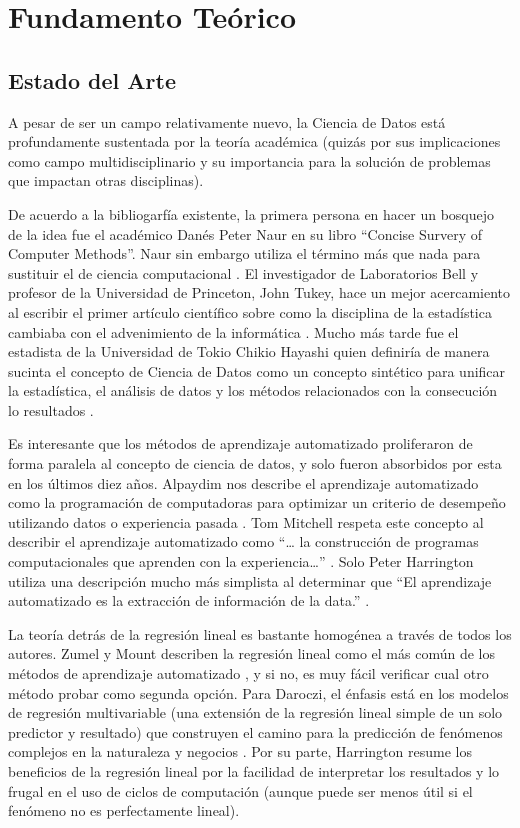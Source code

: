 \chapter{Fundamento Teórico}

\section{Estado del Arte}
A pesar de ser un campo relativamente nuevo, la Ciencia de Datos está profundamente sustentada por la teoría académica (quizás por sus implicaciones como campo multidisciplinario y su importancia para la solución de problemas que impactan otras disciplinas).

De acuerdo a la bibliogarfía existente, la primera persona en hacer un bosquejo de la idea fue el académico Danés Peter Naur en su libro “Concise Survery of Computer Methods”. Naur sin embargo utiliza el término más que nada para sustituir el de ciencia computacional \cite{naur}. El investigador de Laboratorios Bell y profesor de la Universidad de Princeton, John Tukey, hace un mejor acercamiento al escribir el primer artículo científico sobre como la disciplina de la estadística cambiaba con el advenimiento de la informática \cite{tukey}. Mucho más tarde fue el estadista de la Universidad de Tokio Chikio Hayashi quien definiría de manera sucinta el concepto de Ciencia de Datos como un concepto sintético para unificar la estadística, el análisis de datos y los métodos relacionados con la consecución lo resultados \cite{hayashi}.

Es interesante que los métodos de aprendizaje automatizado proliferaron de forma paralela al concepto de ciencia de datos, y solo fueron absorbidos por esta en los últimos diez años. Alpaydim nos describe el aprendizaje automatizado como la programación de computadoras para optimizar un criterio de desempeño utilizando datos o experiencia pasada \cite{alpaydin}. Tom Mitchell respeta este concepto al describir el aprendizaje automatizado como “… la construcción de programas computacionales que aprenden con la experiencia…” \cite[pag. XV]{mitchell}. Solo Peter Harrington utiliza una descripción mucho más simplista al determinar que “El aprendizaje automatizado es la extracción de información de la data.” \cite[pag. 5]{harrington}.

La teoría detrás de la regresión lineal es bastante homogénea a través de todos los autores. Zumel y Mount describen la regresión lineal como el más común de los métodos de aprendizaje automatizado \cite{zumelMount}, y si no, es muy fácil verificar cual otro método probar como segunda opción. Para Daroczi, el énfasis está en los modelos de regresión multivariable (una extensión de la regresión lineal simple de un solo predictor y resultado) que construyen el camino para la predicción de fenómenos complejos en la naturaleza y negocios \cite{daroczi}. Por su parte, Harrington resume los beneficios de la regresión lineal \cite{harrington} por la facilidad de interpretar los resultados y lo frugal en el uso de ciclos de computación (aunque puede ser menos útil si el fenómeno no es perfectamente lineal).
 

